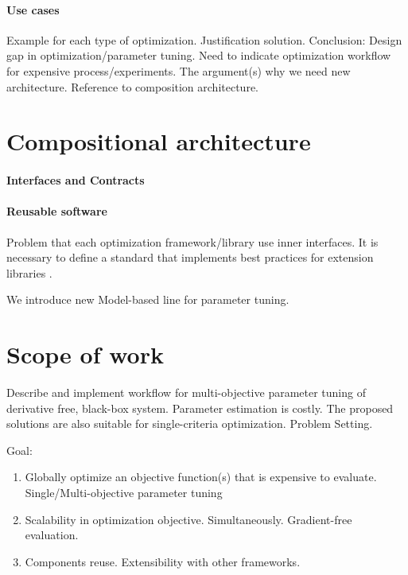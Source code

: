         \cite{EngSurMod}

        \paragraph{Use cases}
        Example for each type of optimization. Justification solution.
        Conclusion: Design gap in optimization/parameter tuning. 
        Need to indicate optimization workflow for expensive process/experiments. 
        The argument(s) why we need new architecture. Reference to composition architecture.

    \section{Compositional architecture}
        \paragraph{Interfaces and Contracts}

        \paragraph{Reusable software}
        Problem that each optimization framework/library use inner interfaces. 
        It is necessary to define a standard that implements best practices for extension libraries \cite{buitinck2013api}.

        We introduce new Model-based line for parameter tuning. 

    \section{Scope of work}

        Describe and implement workflow for multi-objective parameter tuning of derivative free, black-box system. Parameter estimation is costly.
        The proposed solutions are also suitable for single-criteria optimization. Problem Setting.

        Goal:
        \begin{enumerate}
            \item Globally optimize an objective function(s) that is expensive to evaluate. Single/Multi-objective parameter tuning
            \item Scalability in optimization objective. Simultaneously. Gradient-free evaluation.
            \item Components reuse. Extensibility with other frameworks.
        \end{enumerate}

